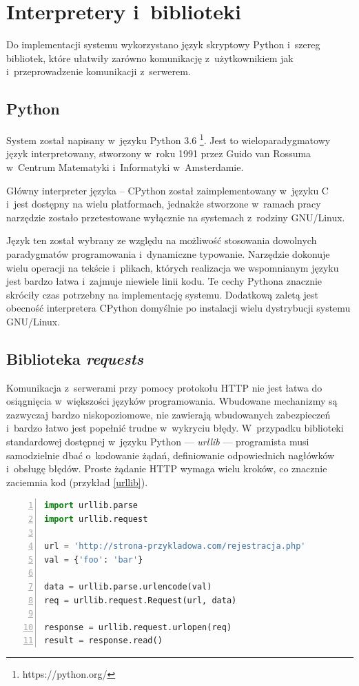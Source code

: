 \documentclass[12pt,a4paper,polish,thesis]{dcsbook}
\begin{document}
\section{Interpretery i~biblioteki}
Do implementacji systemu wykorzystano język skryptowy Python i~szereg bibliotek, które ułatwiły zarówno komunikację z~użytkownikiem jak i~przeprowadzenie komunikacji z~serwerem.

\subsection{Python}
System został napisany w~języku Python 3.6 \footnote{https://python.org/}. Jest to wieloparadygmatowy język interpretowany, stworzony w~roku 1991 przez Guido van Rossuma w~Centrum Matematyki i~Informatyki w~Amsterdamie.

Główny interpreter języka -- CPython został zaimplementowany w~języku C i~jest dostępny na wielu platformach, jednakże stworzone w~ramach pracy narzędzie zostało przetestowane wyłącznie na systemach z~rodziny GNU/Linux.

Język ten został wybrany ze względu na możliwość stosowania dowolnych paradygmatów programowania i~dynamiczne typowanie. Narzędzie dokonuje wielu operacji na tekście i~plikach, których realizacja we wspomnianym języku jest bardzo łatwa i~zajmuje niewiele linii kodu. Te cechy Pythona znacznie skróciły czas potrzebny na implementację systemu. Dodatkową zaletą jest obecność interpretera CPython domyślnie po instalacji wielu dystrybucji systemu GNU/Linux.

\subsection{Biblioteka \textit{requests}}
Komunikacja z~serwerami przy pomocy protokołu HTTP nie jest łatwa do osiągnięcia w~większości języków programowania. Wbudowane mechanizmy są zazwyczaj bardzo niskopoziomowe, nie zawierają wbudowanych zabezpieczeń i~bardzo łatwo jest popełnić trudne w~wykryciu błędy. W~przypadku biblioteki standardowej dostępnej w~języku Python --- \textit{urllib} --- programista musi samodzielnie dbać o~kodowanie żądań, definiowanie odpowiednich nagłówków i~obsługę błędów. Proste żądanie HTTP wymaga wielu kroków, co znacznie zaciemnia kod (przykład \ref{urllib}).

\begin{lstlisting}[language=python,frame=single,caption=Wykorzystanie biblioteki urllib,label=urllib,numbers=left]
import urllib.parse
import urllib.request

url = 'http://strona-przykladowa.com/rejestracja.php'
val = {'foo': 'bar'}

data = urllib.parse.urlencode(val)
req = urllib.request.Request(url, data)

response = urllib.request.urlopen(req)
result = response.read()
\end{lstlisting}
\end{document}
